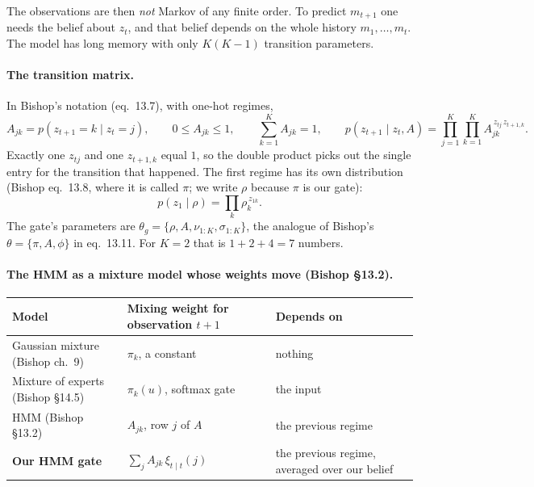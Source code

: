 The observations are then \emph{not} Markov of any finite order. To predict $m_{t+1}$ one needs the belief about $z_t$, and that belief depends on the whole history $m_1,\dots,m_t$. The model has long memory with only $K(K-1)$ transition parameters.

\paragraph{The transition matrix.} In Bishop's notation (eq.~13.7), with one-hot regimes,
\begin{equation}
A_{jk}=p(z_{t+1}=k\mid z_t=j),\qquad 0\le A_{jk}\le1,\qquad\sum_{k=1}^KA_{jk}=1,\qquad p(z_{t+1}\mid z_t,A)=\prod_{j=1}^K\prod_{k=1}^KA_{jk}^{\,z_{tj}\,z_{t+1,k}}.
\end{equation}
Exactly one $z_{tj}$ and one $z_{t+1,k}$ equal $1$, so the double product picks out the single entry for the transition that happened. The first regime has its own distribution (Bishop eq.~13.8, where it is called $\pi$; we write $\rho$ because $\pi$ is our gate):
\begin{equation}
p(z_1\mid\rho)=\prod_k\rho_k^{\,z_{1k}}.
\end{equation}
The gate's parameters are $\theta_g=\{\rho,A,\nu_{1:K},\sigma_{1:K}\}$, the analogue of Bishop's $\theta=\{\pi,A,\phi\}$ in eq.~13.11. For $K=2$ that is $1+2+4=7$ numbers.

\paragraph{The HMM as a mixture model whose weights move (Bishop \S13.2).}
\begin{center}
\renewcommand{\arraystretch}{1.25}
\begin{tabularx}{\textwidth}{@{}llX@{}}
\toprule
Model & Mixing weight for observation $t+1$ & Depends on \\
\midrule
Gaussian mixture (Bishop ch.\ 9) & $\pi_k$, a constant & nothing \\
Mixture of experts (Bishop \S14.5) & $\pi_k(u)$, softmax gate & the input \\
HMM (Bishop \S13.2) & $A_{jk}$, row $j$ of $A$ & the previous regime \\
\textbf{Our HMM gate} & $\sum_jA_{jk}\,\xi_{t\mid t}(j)$ & the previous regime, averaged over our belief \\
\bottomrule
\end{tabularx}
\end{center}

